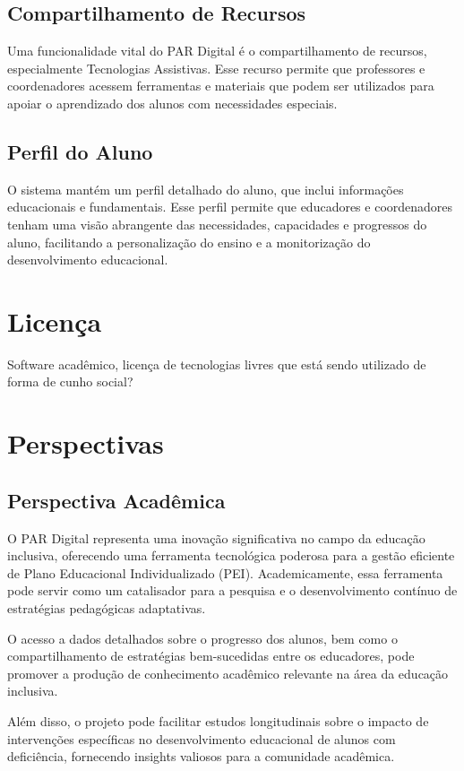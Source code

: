 \documentclass[sigconf]{webmedia}
\begin{document}
\subsection{Compartilhamento de Recursos}
Uma funcionalidade vital do PAR Digital é o compartilhamento de 
recursos, especialmente Tecnologias Assistivas. Esse recurso 
permite que professores e coordenadores acessem ferramentas e 
materiais que podem ser utilizados para apoiar o aprendizado 
dos alunos com necessidades especiais.

\subsection{Perfil do Aluno}
O sistema mantém um perfil detalhado do aluno, que inclui informações
 educacionais e fundamentais. Esse perfil permite que educadores e 
 coordenadores tenham uma visão abrangente das necessidades, 
 capacidades e progressos do aluno, facilitando a personalização 
 do ensino e a monitorização do desenvolvimento educacional.



\section{Licença}
Software acadêmico, licença de tecnologias livres que está
 sendo utilizado de forma de cunho social?


\section{Perspectivas}

\subsection{Perspectiva Acadêmica}
O PAR Digital representa uma inovação significativa no campo 
da educação inclusiva, oferecendo uma ferramenta tecnológica 
poderosa para a gestão eficiente de Plano Educacional 
Individualizado (PEI). Academicamente, essa ferramenta pode 
servir como um catalisador para a pesquisa e o 
desenvolvimento contínuo de estratégias pedagógicas 
adaptativas. 

O acesso a dados detalhados sobre o progresso dos alunos, 
bem como o compartilhamento de estratégias bem-sucedidas 
entre os educadores, pode promover a produção de conhecimento
 acadêmico relevante na área da educação inclusiva. 

Além disso, o projeto pode facilitar estudos longitudinais 
sobre o impacto de intervenções específicas no 
desenvolvimento educacional de alunos com deficiência, 
fornecendo insights valiosos para a comunidade acadêmica.
\end{document}
